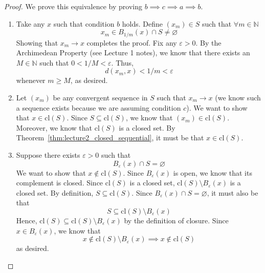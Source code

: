 \documentclass{article}
\newcommand{\cl}{\text{cl}}
\newcommand{\N}{\mathbb{N}}
\theoremstyle{definition}
\begin{document}
\begin{proof}
    We prove this equivalence by proving $b \implies c \implies a \implies b$.
    \begin{enumerate}
        \item[$(b\Rightarrow c)$] Take any $x$ such that condition $b$ holds. Define $(x_m)\in S$ such that $\forall m\in \N$
        \begin{equation*}
            x_m \in B_{1/m}(x)\cap S \neq \varnothing
        \end{equation*}
        Showing that $x_m \to x$ completes the proof. Fix any $\varepsilon > 0$. By the Archimedean Property (see Lecture 1 notes), we know that there exists an $M\in \N$ such that $0 < 1/M < \varepsilon$. Thus,
        \begin{equation*}
            d(x_m,x) < 1/m < \varepsilon
        \end{equation*}
        whenever $m\geq M$, as desired. 
        
        \item[$(c\Rightarrow a)$]
        Let $(x_m)$ be any convergent sequence in $S$ such that $x_m \to x$ (we know such a sequence exists because we are assuming condition $c$). We want to show that $x \in \cl(S)$. Since $S \subseteq \cl(S)$, we know that $(x_m) \in \cl(S)$. Moreover, we know that $\cl(S)$ is a closed set. By Theorem~\ref{thm:lecture2_closed_sequential}, it must be that $x\in \cl(S)$. 
        
        \item[$(a\Rightarrow b)$] Suppose there exists $\varepsilon > 0$ such that 
        \begin{equation*}
            B_\varepsilon(x) \cap S = \varnothing
        \end{equation*}
        We want to show that $x\not\in \cl(S)$. Since $B_\varepsilon(x)$ is open, we know that its complement is closed. Since $\cl(S)$ is a closed set, $\cl(S)\setminus B_\varepsilon(x)$ is a closed set. By definition, $S \subseteq \cl(S)$. Since $B_\varepsilon(x) \cap S = \varnothing$, it must also be that 
        \begin{equation*}
            S \subseteq \cl(S)\setminus B_\varepsilon(x)
        \end{equation*}
        Hence, $\cl(S) \subseteq \cl(S)\setminus B_\varepsilon(x)$ by the definition of closure. Since $x \in B_\varepsilon(x)$, we know that
        \begin{equation*}
            x\not\in \cl(S)\setminus B_\varepsilon(x) \implies x \not\in \cl(S)
        \end{equation*}
        as desired. 
    \end{enumerate}
\end{proof}
\end{document}
